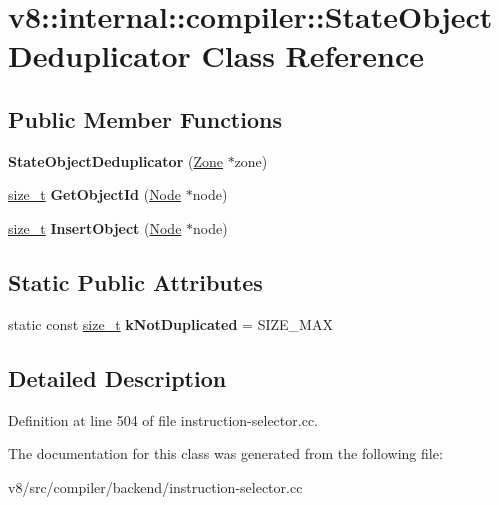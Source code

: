 \hypertarget{classv8_1_1internal_1_1compiler_1_1StateObjectDeduplicator}{}\section{v8\+:\+:internal\+:\+:compiler\+:\+:State\+Object\+Deduplicator Class Reference}
\label{classv8_1_1internal_1_1compiler_1_1StateObjectDeduplicator}
\subsection*{Public Member Functions}
\begin{DoxyCompactItemize}
\item 
\mbox{\label{classv8_1_1internal_1_1compiler_1_1StateObjectDeduplicator_a848afe626a1c4b2e339405e44251c62e}} 
{\bfseries State\+Object\+Deduplicator} (\mbox{\hyperlink{classv8_1_1internal_1_1Zone}{Zone}} $\ast$zone)
\item 
\mbox{\label{classv8_1_1internal_1_1compiler_1_1StateObjectDeduplicator_a37a5c95bcede510b56d1ce20c49480e0}} 
\mbox{\hyperlink{classsize__t}{size\+\_\+t}} {\bfseries Get\+Object\+Id} (\mbox{\hyperlink{classv8_1_1internal_1_1compiler_1_1Node}{Node}} $\ast$node)
\item 
\mbox{\label{classv8_1_1internal_1_1compiler_1_1StateObjectDeduplicator_acaf8e448976eb645cf077d67dfe31a2e}} 
\mbox{\hyperlink{classsize__t}{size\+\_\+t}} {\bfseries Insert\+Object} (\mbox{\hyperlink{classv8_1_1internal_1_1compiler_1_1Node}{Node}} $\ast$node)
\end{DoxyCompactItemize}
\subsection*{Static Public Attributes}
\begin{DoxyCompactItemize}
\item 
\mbox{\label{classv8_1_1internal_1_1compiler_1_1StateObjectDeduplicator_aa0052074a37b6d071224ab2c1d85efb3}} 
static const \mbox{\hyperlink{classsize__t}{size\+\_\+t}} {\bfseries k\+Not\+Duplicated} = S\+I\+Z\+E\+\_\+\+M\+AX
\end{DoxyCompactItemize}


\subsection{Detailed Description}


Definition at line 504 of file instruction-\/selector.\+cc.



The documentation for this class was generated from the following file\+:\begin{DoxyCompactItemize}
\item 
v8/src/compiler/backend/instruction-\/selector.\+cc\end{DoxyCompactItemize}
